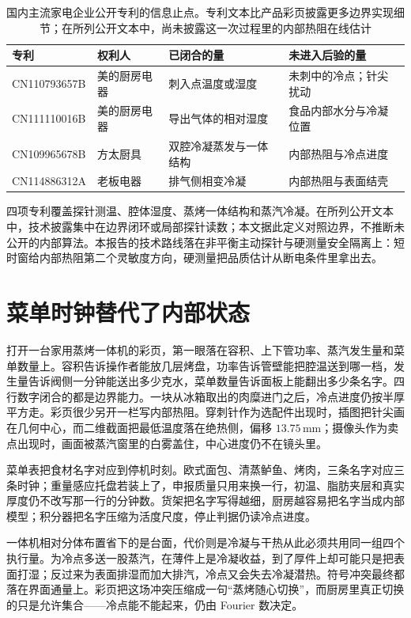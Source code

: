 \begin{table}[t]
\centering
\caption{国内主流家电企业公开专利的信息止点。专利文本比产品彩页披露更多边界实现细节；在所列公开文本中，尚未披露这一次过程里的内部热阻在线估计}
\label{tab:patent}
\begin{tabularx}{\textwidth}{l>{\raggedright\arraybackslash}p{3.4cm}>{\raggedright\arraybackslash}p{3.4cm}>{\raggedright\arraybackslash}p{3.6cm}}
\toprule
专利 & 权利人 & 已闭合的量 & 未进入后验的量 \\
\midrule
CN110793657B & 美的厨房电器 & 刺入点温度或湿度 & 未刺中的冷点；针尖扰动 \\
CN111110016B & 美的厨房电器 & 导出气体的相对湿度 & 食品内部水分与冷凝位置 \\
CN109965678B & 方太厨具 & 双腔冷凝蒸发与一体结构 & 内部热阻与冷点进度 \\
CN114886312A & 老板电器 & 排气侧相变冷凝 & 内部热阻与表面结壳 \\
\bottomrule
\end{tabularx}
\end{table}

四项专利覆盖探针测温、腔体湿度、蒸烤一体结构和蒸汽冷凝。在所列公开文本中，技术披露集中在边界闭环或局部探针读数；本文据此定义对照边界，不推断未公开的内部算法。本报告的技术路线落在非平衡主动探针与硬测量安全隔离上：短时窗给内部热阻第二个灵敏度方向，硬测量把品质估计从断电条件里拿出去。

\section{菜单时钟替代了内部状态}

打开一台家用蒸烤一体机的彩页，第一眼落在容积、上下管功率、蒸汽发生量和菜单数量上。容积告诉操作者能放几层烤盘，功率告诉管壁能把腔温送到哪一档，发生量告诉阀侧一分钟能送出多少克水，菜单数量告诉面板上能翻出多少条名字。四行数字闭合的都是边界能力。一块从冰箱取出的肉糜进门之后，冷点进度仍按半厚平方走。彩页很少另开一栏写内部热阻。穿刺针作为选配件出现时，插图把针尖画在几何中心，而二维截面把最低温度落在绝热侧，偏移 \(13.75\,\mathrm{mm}\)；摄像头作为卖点出现时，画面被蒸汽窗里的白雾盖住，中心进度仍不在镜头里。

菜单表把食材名字对应到停机时刻。欧式面包、清蒸鲈鱼、烤肉，三条名字对应三条时钟；重量感应托盘若装上了，申报质量只用来换一行，初温、脂肪夹层和真实厚度仍不改写那一行的分钟数。货架把名字写得越细，厨房越容易把名字当成内部模型；积分器把名字压缩为活度尺度，停止判据仍读冷点进度。

一体机相对分体布置省下的是台面，代价则是冷凝与干热从此必须共用同一组四个执行量。为冷点多送一股蒸汽，在薄件上是冷凝收益，到了厚件上却可能只是把表面打湿；反过来为表面排湿而加大排汽，冷点又会失去冷凝潜热。符号冲突最终都落在界面通量上。彩页把这场冲突压缩成一句“蒸烤随心切换”，而厨房里真正切换的只是允许集合——冷点能不能起来，仍由 Fourier 数决定。


